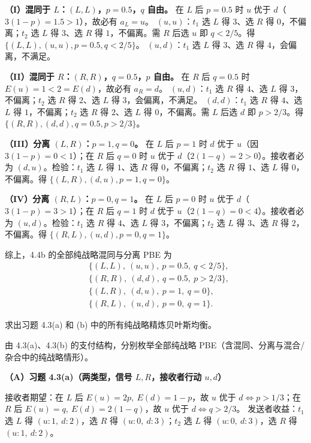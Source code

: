 \textbf{（I）混同于 $L$：$(L,L)$，$p=0.5$，$q$ 自由。} 在 $L$ 后 $p=0.5$ 时 $u$ 优于 $d$（$3(1-p)=1.5>1$），故必有 $a_L=u$。
$(u,u)$：$t_1$ 选 $L$ 得 $3$、选 $R$ 得 $0$，不偏离；$t_2$ 选 $L$ 得 $3$、选 $R$ 得 $1$，不偏离。需 $R$ 后选 $u$ 即 $q<2/5$。得 $\{(L,L),(u,u),p=0.5,q<2/5\}$。
$(u,d)$：$t_1$ 选 $L$ 得 $3$、选 $R$ 得 $4$，会偏离，不满足。

\textbf{（II）混同于 $R$：$(R,R)$，$q=0.5$，$p$ 自由。} 在 $R$ 后 $q=0.5$ 时 $E(u)=1<2=E(d)$，故必有 $a_R=d$。
$(u,d)$：$t_1$ 选 $R$ 得 $4$、选 $L$ 得 $3$，不偏离；$t_2$ 选 $R$ 得 $2$、选 $L$ 得 $3$，会偏离，不满足。
$(d,d)$：$t_1$ 选 $R$ 得 $4$、选 $L$ 得 $1$，不偏离；$t_2$ 选 $R$ 得 $2$、选 $L$ 得 $0$，不偏离。需 $L$ 后选 $d$ 即 $p>2/3$。得 $\{(R,R),(d,d),q=0.5,p>2/3\}$。

\textbf{（III）分离 $(L,R)$：$p=1,q=0$。} 在 $L$ 后 $p=1$ 时 $d$ 优于 $u$（因 $3(1-p)=0<1$）；在 $R$ 后 $q=0$ 时 $u$ 优于 $d$（$2(1-q)=2>0$）。接收者必为 $(d,u)$。检验：$t_1$ 选 $L$ 得 $1$、选 $R$ 得 $0$，不偏离；$t_2$ 选 $R$ 得 $1$、选 $L$ 得 $0$，不偏离。得 $\{(L,R),(d,u),p=1,q=0\}$。

\textbf{（IV）分离 $(R,L)$：$p=0,q=1$。} 在 $L$ 后 $p=0$ 时 $u$ 优于 $d$（$3(1-p)=3>1$）；在 $R$ 后 $q=1$ 时 $d$ 优于 $u$（$2(1-q)=0<4$）。接收者必为 $(u,d)$。检验：$t_1$ 选 $R$ 得 $4$、选 $L$ 得 $3$，不偏离；$t_2$ 选 $L$ 得 $3$、选 $R$ 得 $2$，不偏离。得 $\{(R,L),(u,d),p=0,q=1\}$。

综上，4.4b 的全部纯战略混同与分离 PBE 为
\[
  \begin{aligned}
    &\bigl\{(L,L),\ (u,u),\ p=0.5,\ q<2/5\bigr\},\\
    &\bigl\{(R,R),\ (d,d),\ q=0.5,\ p>2/3\bigr\},\\
    &\bigl\{(L,R),\ (d,u),\ p=1,\ q=0\bigr\},\\
    &\bigl\{(R,L),\ (u,d),\ p=0,\ q=1\bigr\}.
  \end{aligned}
\]

求出习题 4.3(a) 和 (b) 中的所有纯战略精炼贝叶斯均衡。

\sol 由 4.3(a)、4.3(b) 的支付结构，分别枚举全部纯战略 PBE（含混同、分离与混合/杂合中的纯战略情形）。

\textbf{（A）习题 4.3(a)（两类型，信号 $L,R$，接收者行动 $u,d$）}

接收者期望：在 $L$ 后 $E(u)=2p,\ E(d)=1-p$，故 $u$ 优于 $d\iff p>1/3$；在 $R$ 后 $E(u)=q,\ E(d)=2(1-q)$，故 $u$ 优于 $d\iff q>2/3$。
发送者收益：$t_1$ 选 $L$ 得 $(u:1,\ d:2)$，选 $R$ 得 $(u:0,\ d:3)$；$t_2$ 选 $L$ 得 $(u:0,\ d:3)$，选 $R$ 得 $(u:1,\ d:2)$。

